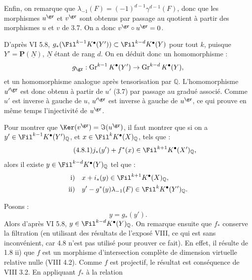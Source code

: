 
Enfin, on remarque que \(\lambda_{-1}(F)=(-1)^{d-1}\gamma^{d-1}(F)\), donc que les morphismes \(u^{\gr}\) et \(v^{\gr}\) sont obtenus par passage au quotient à partir des morphismes \(u\) et \(v\) de 3.7. On a donc \(v^{\gr}\circ u^{\gr}=0\).

D'après VI 5.8, \(g_*(\Fil^{k-1}K^{\bullet}(Y'))\subset \Fil^{k-d}K^{\bullet}(Y)\) pour tout \(k\), puisque \(Y'=\mathbf P(\underline{N})\), \(\underline{N}\) étant de rang \(d\). On en déduit donc un homomorphisme :
\[
  g_{\gr}:\operatorname{Gr}^{k-1}K^{\bullet}(Y')
  \to\operatorname{Gr}^{k-d}K^{\bullet}(Y),
\]
et un homomorphisme analogue après tensorisation par \(\mathbb Q\). L'homomorphisme \(u'^{\gr}\) est donc obtenu à partir de \(u'\) (3.7) par passage au gradué associé. Comme \(u'\) est inverse à gauche de \(u\), \(u'^{\gr}\) est inverse à gauche de \(u^{\gr}\), ce qui prouve en même temps l'injectivité de \(u^{\gr}\).

Pour montrer que \(\Ker(v^{\gr})=\Im(u^{\gr})\), il faut montrer que si on a \(y'\in\Fil^{k-1}K^{\bullet}(Y')_{\mathbb Q}\), et \(x\in\Fil^kK^{\bullet}(X)_{\mathbb Q}\), tels que :
\begin{equation}\tag{4.8.1}
  j_*(y')+f^*(x)\in\Fil^{k+1}K^{\bullet}(X')_{\mathbb Q},
\end{equation}
alors il existe \(y\in\Fil^{k-d}K^{\bullet}(Y)_{\mathbb Q}\) tel que :
\[
\begin{aligned}
\text{i)}\quad &x+i_*(y)\in\Fil^{k+1}K^{\bullet}(X)_{\mathbb Q},\\
\text{ii)}\quad &y'-g^*(y)\lambda_{-1}(F)\in\Fil^{k}K^{\bullet}(Y')_{\mathbb Q}.
\end{aligned}
\]

Posons :
\[
  y=g_*(y').
\]
Alors d'après VI 5.8, \(y\in\Fil^{k-d}K^{\bullet}(Y)_{\mathbb Q}\). On remarque ensuite que \(f_*\) conserve la filtration (en utilisant des résultats de l'exposé VIII, ce qui est sans inconvénient, car 4.8 n'est pas utilisé pour prouver ce fait). En effet, il résulte de 1.8 ii) que \(f\) est un morphisme d'intersection complète de dimension virtuelle relative nulle (VIII 4.2). Comme \(f\) est projectif, le résultat est conséquence de VIII 3.2. En appliquant \(f_*\) à la relation
